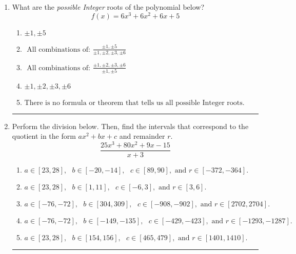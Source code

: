 \documentclass[14pt]{extbook}
\newcommand{\litem}[1]{\item#1\hspace*{-1cm}\rule{\textwidth}{0.4pt}}
\begin{document}
\begin{enumerate}
{\begin{enumerate}[label=\Alph*.]
\end{enumerate} }
\litem{
What are the \textit{possible Integer} roots of the polynomial below?\[ f(x) = 6x^{3} +6 x^{2} +6 x + 5 \]\begin{enumerate}[label=\Alph*.]
\item \( \pm 1,\pm 5 \)
\item \( \text{ All combinations of: }\frac{\pm 1,\pm 5}{\pm 1,\pm 2,\pm 3,\pm 6} \)
\item \( \text{ All combinations of: }\frac{\pm 1,\pm 2,\pm 3,\pm 6}{\pm 1,\pm 5} \)
\item \( \pm 1,\pm 2,\pm 3,\pm 6 \)
\item \( \text{There is no formula or theorem that tells us all possible Integer roots.} \)

\end{enumerate} }
\litem{
Perform the division below. Then, find the intervals that correspond to the quotient in the form $ax^2+bx+c$ and remainder $r$.\[ \frac{25x^{3} +80 x^{2} +9 x -15}{x + 3} \]\begin{enumerate}[label=\Alph*.]
\item \( a \in [23, 28], \text{   } b \in [-20, -14], \text{   } c \in [89, 90], \text{   and   } r \in [-372, -364]. \)
\item \( a \in [23, 28], \text{   } b \in [1, 11], \text{   } c \in [-6, 3], \text{   and   } r \in [3, 6]. \)
\item \( a \in [-76, -72], \text{   } b \in [304, 309], \text{   } c \in [-908, -902], \text{   and   } r \in [2702, 2704]. \)
\item \( a \in [-76, -72], \text{   } b \in [-149, -135], \text{   } c \in [-429, -423], \text{   and   } r \in [-1293, -1287]. \)
\item \( a \in [23, 28], \text{   } b \in [154, 156], \text{   } c \in [465, 479], \text{   and   } r \in [1401, 1410]. \)

\end{enumerate} }
\end{enumerate}
\end{document}
